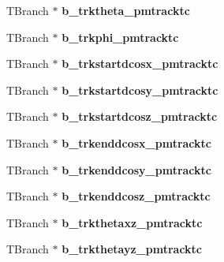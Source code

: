 \begin{DoxyCompactItemize}
\item 
\hypertarget{classanatree_a1a523ae53ce709311467e97f1ff1569b}{T\-Branch $\ast$ {\bfseries b\-\_\-trktheta\-\_\-pmtracktc}}\label{classanatree_a1a523ae53ce709311467e97f1ff1569b}

\item 
\hypertarget{classanatree_a45485e41f14006da8ce4be3ac67f7ca4}{T\-Branch $\ast$ {\bfseries b\-\_\-trkphi\-\_\-pmtracktc}}\label{classanatree_a45485e41f14006da8ce4be3ac67f7ca4}

\item 
\hypertarget{classanatree_a6ba235f9beb026e48c7f70c61cab06de}{T\-Branch $\ast$ {\bfseries b\-\_\-trkstartdcosx\-\_\-pmtracktc}}\label{classanatree_a6ba235f9beb026e48c7f70c61cab06de}

\item 
\hypertarget{classanatree_af971449f44d1c957d3ca5326802a2f2e}{T\-Branch $\ast$ {\bfseries b\-\_\-trkstartdcosy\-\_\-pmtracktc}}\label{classanatree_af971449f44d1c957d3ca5326802a2f2e}

\item 
\hypertarget{classanatree_a80c4ec66cae13c13119a3cad1f936895}{T\-Branch $\ast$ {\bfseries b\-\_\-trkstartdcosz\-\_\-pmtracktc}}\label{classanatree_a80c4ec66cae13c13119a3cad1f936895}

\item 
\hypertarget{classanatree_ac712ef1b5e714989f0540877c0d84f97}{T\-Branch $\ast$ {\bfseries b\-\_\-trkenddcosx\-\_\-pmtracktc}}\label{classanatree_ac712ef1b5e714989f0540877c0d84f97}

\item 
\hypertarget{classanatree_aa5a54f5da766c9944643c30760f64587}{T\-Branch $\ast$ {\bfseries b\-\_\-trkenddcosy\-\_\-pmtracktc}}\label{classanatree_aa5a54f5da766c9944643c30760f64587}

\item 
\hypertarget{classanatree_a183f3cfaa5f6f42bfcb2dd3bd2df4b6e}{T\-Branch $\ast$ {\bfseries b\-\_\-trkenddcosz\-\_\-pmtracktc}}\label{classanatree_a183f3cfaa5f6f42bfcb2dd3bd2df4b6e}

\item 
\hypertarget{classanatree_ad561c76632d04b70faf906487ada62c0}{T\-Branch $\ast$ {\bfseries b\-\_\-trkthetaxz\-\_\-pmtracktc}}\label{classanatree_ad561c76632d04b70faf906487ada62c0}

\item 
\hypertarget{classanatree_ac15e5e08a57990892d1d7c2111982582}{T\-Branch $\ast$ {\bfseries b\-\_\-trkthetayz\-\_\-pmtracktc}}\label{classanatree_ac15e5e08a57990892d1d7c2111982582}


\end{DoxyCompactItemize}
